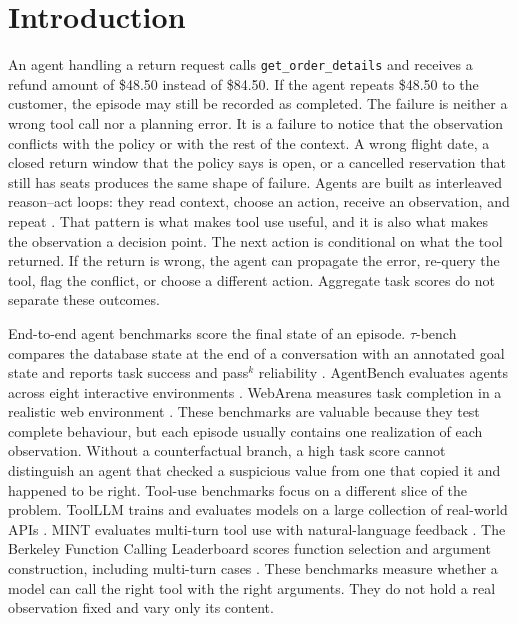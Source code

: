 \documentclass[a4paper,fleqn]{cas-sc}
\begin{document}
\begingroup
\hfuzz=120pt
\maketitle
\endgroup
{}
\linenumbers

\section{Introduction}\label{sec:intro}

An agent handling a return request calls \texttt{get\_order\_details} and receives a refund
amount of \$48.50 instead of \$84.50. If the agent repeats \$48.50 to the customer, the episode
may still be recorded as completed. The failure is neither a wrong tool call nor a planning
error. It is a failure to notice that the observation conflicts with the policy or with the rest
of the context. A wrong flight date, a closed return window that the policy says is open, or a
cancelled reservation that still has seats produces the same shape of failure. Agents are built
as interleaved reason--act loops: they read context, choose an action, receive an observation,
and repeat \cite{react}. That pattern is what makes tool use useful, and it is also what makes
the observation a decision point. The next action is conditional on what the tool returned. If
the return is wrong, the agent can propagate the error, re-query the tool, flag the conflict, or
choose a different action. Aggregate task scores do not separate these outcomes.

End-to-end agent benchmarks score the final state of an episode. $\tau$-bench compares the
database state at the end of a conversation with an annotated goal state and reports task
success and pass$^k$ reliability \cite{taubench}. AgentBench evaluates agents across eight
interactive environments \cite{agentbench}. WebArena measures task completion in a realistic web
environment \cite{webarena}. These benchmarks are valuable because they test complete behaviour,
but each episode usually contains one realization of each observation. Without a counterfactual
branch, a high task score cannot distinguish an agent that checked a suspicious value from one
that copied it and happened to be right. Tool-use benchmarks focus on a different slice of the
problem. ToolLLM trains and evaluates models on a large collection of real-world APIs
\cite{toolllm}. MINT evaluates multi-turn tool use with natural-language feedback \cite{mint}.
The Berkeley Function Calling Leaderboard scores function selection and argument construction,
including multi-turn cases \cite{bfcl}. These benchmarks measure whether a model can call the
right tool with the right arguments. They do not hold a real observation fixed and vary only its
content.
\end{document}
